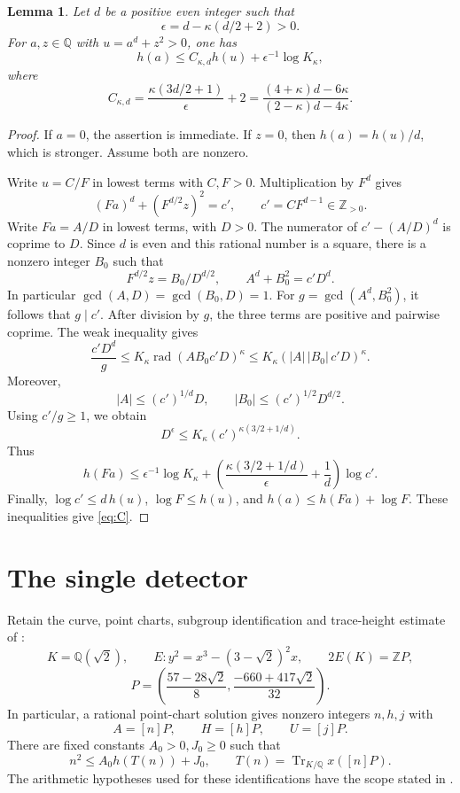 \documentclass[11pt,a4paper]{article}
\newtheorem{lemma}[theorem]{Lemma}
\newcommand{\Q}{\mathbb Q}\newcommand{\Z}{\mathbb Z}
\DeclareMathOperator{\Tr}{Tr}
\DeclareMathOperator{\rad}{rad}
\begin{document}
\begin{lemma}\label{lem:mixed}
Let \(d\) be a positive even integer such that
\[
 \epsilon=d-\kappa(d/2+2)>0.
\]
For \(a,z\in\Q\) with \(u=a^d+z^2>0\), one has
\[
 h(a)\le C_{\kappa,d}h(u)+\epsilon^{-1}\log K_\kappa,
\]
where
\begin{equation}\label{eq:C}
 C_{\kappa,d}=
 \frac{\kappa(3d/2+1)}{\epsilon}+2
 =
 \frac{(4+\kappa)d-6\kappa}{(2-\kappa)d-4\kappa}.
\end{equation}
\end{lemma}
\begin{proof}
If \(a=0\), the assertion is immediate. If \(z=0\), then
\(h(a)=h(u)/d\), which is stronger. Assume both are nonzero.

Write \(u=C/F\) in lowest terms with \(C,F>0\). Multiplication by \(F^d\)
gives
\[
 (Fa)^d+(F^{d/2}z)^2=c',\qquad c'=CF^{d-1}\in\Z_{>0}.
\]
Write \(Fa=A/D\) in lowest terms, with \(D>0\).
The numerator of \(c'-(A/D)^d\) is coprime to \(D\).
Since \(d\) is even and this rational number is a square, there is a
nonzero integer \(B_0\) such that
\[
 F^{d/2}z=B_0/D^{d/2},\qquad A^d+B_0^2=c'D^d.
\]
In particular \(\gcd(A,D)=\gcd(B_0,D)=1\).
For \(g=\gcd(A^d,B_0^2)\), it follows that \(g\mid c'\).
After division by \(g\), the three terms are positive and pairwise
coprime. The weak inequality gives
\[
 \frac{c'D^d}{g}
 \le K_\kappa\rad(A B_0 c'D)^\kappa
 \le K_\kappa(|A|\,|B_0|\,c'D)^\kappa.
\]
Moreover,
\[
 |A|\le(c')^{1/d}D,\qquad
 |B_0|\le(c')^{1/2}D^{d/2}.
\]
Using \(c'/g\ge1\), we obtain
\[
 D^\epsilon\le K_\kappa(c')^{\kappa(3/2+1/d)}.
\]
Thus
\[
 h(Fa)\le\epsilon^{-1}\log K_\kappa+
 \left(\frac{\kappa(3/2+1/d)}{\epsilon}+\frac1d\right)\log c'.
\]
Finally, \(\log c'\le d\,h(u)\), \(\log F\le h(u)\), and
\(h(a)\le h(Fa)+\log F\). These inequalities give \eqref{eq:C}.
\end{proof}

\section{The single detector}

Retain the curve, point charts, subgroup identification and trace-height
estimate of \cite{Conditional}:
\[
 K=\Q(\sqrt2),\qquad E:y^2=x^3-(3-\sqrt2)^2x,\qquad
 2E(K)=\Z P,
\]
\[
 P=\left(\frac{57-28\sqrt2}{8},
          \frac{-660+417\sqrt2}{32}\right).
\]
In particular, a rational point-chart solution gives nonzero integers
\(n,h,j\) with
\[
 A=[n]P,\qquad H=[h]P,\qquad U=[j]P.
\]
There are fixed constants \(A_0>0,J_0\ge0\) such that
\begin{equation}\label{eq:traceheight}
 n^2\le A_0 h(T(n))+J_0,\qquad
 T(n)=\Tr_{K/\Q}x([n]P).
\end{equation}
The arithmetic hypotheses used for these identifications have the
scope stated in \cite{Conditional}.
\end{document}
